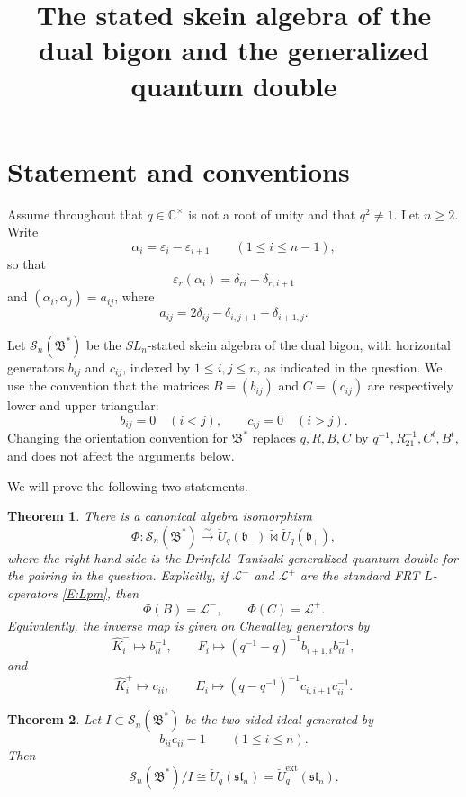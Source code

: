 \documentclass[11pt]{amsart}
\newtheorem{theorem}{Theorem}[section]
\theoremstyle{definition}
\theoremstyle{remark}
\newcommand{\C}{\mathbb C}
\newcommand{\eps}{\varepsilon}
\begin{document}
\title[Stated skein algebra of the dual bigon]
{The stated skein algebra of the dual bigon and the generalized quantum double}
\date{}
\maketitle

\section{Statement and conventions}

Assume throughout that \(q\in\C^\times\) is not a root of unity and that
\(q^2\neq 1\).  Let \(n\geq2\).  Write
\[
\alpha_i=\eps_i-\eps_{i+1}\qquad (1\leq i\leq n-1),
\]
so that
\[
\eps_r(\alpha_i)=\delta_{ri}-\delta_{r,i+1}
\]
and \((\alpha_i,\alpha_j)=a_{ij}\), where
\[
a_{ij}=2\delta_{ij}-\delta_{i,j+1}-\delta_{i+1,j}.
\]

Let \(\mathcal S_n(\mathfrak B^*)\) be the \(SL_n\)-stated skein algebra of
the dual bigon, with horizontal generators \(b_{ij}\) and \(c_{ij}\), indexed
by \(1\leq i,j\leq n\), as indicated in the question.  We use the convention
that the matrices \(B=(b_{ij})\) and \(C=(c_{ij})\) are respectively lower
and upper triangular:
\[
b_{ij}=0\quad(i<j),\qquad c_{ij}=0\quad(i>j).
\]
Changing the orientation convention for \(\mathfrak B^*\) replaces
\(q,R,B,C\) by \(q^{-1},R_{21}^{-1},C^t,B^t\), and does not affect the
arguments below.

We will prove the following two statements.

\begin{theorem}\label{T:main-double}
There is a canonical algebra isomorphism
\[
\Phi:\mathcal S_n(\mathfrak B^*)\xrightarrow{\sim}
\breve U_q(\mathfrak b_-)\mathbin{\widetilde\bowtie}
\breve U_q(\mathfrak b_+),
\]
where the right-hand side is the Drinfeld--Tanisaki generalized quantum
double for the pairing in the question.  Explicitly, if
\(\mathcal L^-\) and \(\mathcal L^+\) are the standard FRT \(L\)-operators
\eqref{E:Lpm}, then
\[
\Phi(B)=\mathcal L^-,\qquad \Phi(C)=\mathcal L^+.
\]
Equivalently, the inverse map is given on Chevalley generators by
\[
\hat K_i^-\longmapsto b_{ii}^{-1},\qquad
F_i\longmapsto
(q^{-1}-q)^{-1}b_{i+1,i}b_{ii}^{-1},
\]
and
\[
\hat K_i^+\longmapsto c_{ii},\qquad
E_i\longmapsto
(q-q^{-1})^{-1}c_{i,i+1}c_{ii}^{-1}.
\]
\end{theorem}

\begin{theorem}\label{T:main-quotient}
Let \(I\subset\mathcal S_n(\mathfrak B^*)\) be the two-sided ideal generated
by
\[
b_{ii}c_{ii}-1\qquad(1\leq i\leq n).
\]
Then
\[
\mathcal S_n(\mathfrak B^*)/I\cong \breve U_q(\mathfrak{sl}_n)
=\breve U_q^{\mathrm{ext}}(\mathfrak{sl}_n).
\]
\end{theorem}
\end{document}
